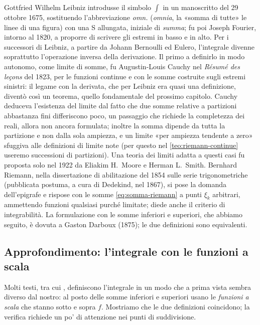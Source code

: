 \begin{notastorica}
Gottfried Wilhelm Leibniz introdusse il simbolo $\int$ in un manoscritto del 29 ottobre
1675, sostituendo l'abbreviazione \emph{omn.} (\emph{omnia}, la «somma di tutte» le
linee di una figura) con una S allungata, iniziale di \emph{summa}; fu poi Joseph
Fourier, intorno al 1820, a proporre di scrivere gli estremi in basso e in alto. Per i
successori di Leibniz, a partire da Johann Bernoulli ed Eulero, l'integrale divenne
soprattutto l'operazione inversa della derivazione. Il primo a definirlo in modo
autonomo, come limite di somme, fu Augustin-Louis Cauchy nel \emph{Résumé des leçons}
del 1823, per le funzioni continue e con le somme costruite sugli estremi sinistri: il
legame con la derivata, che per Leibniz era quasi una definizione, diventò così un
teorema, quello fondamentale del prossimo capitolo. Cauchy deduceva l'esistenza del
limite dal fatto che due somme relative a partizioni abbastanza fini differiscono poco,
un passaggio che richiede la completezza dei reali, allora non ancora formulata; inoltre
la somma dipende da tutta la partizione e non dalla sola ampiezza, e un limite «per
ampiezza tendente a zero» sfuggiva alle definizioni di limite note (per questo nel
\cref{teo:riemann-continue} useremo successioni di partizioni). Una teoria dei limiti
adatta a questi casi fu proposta solo nel 1922 da Eliakim H.~Moore e Herman L.~Smith.
Bernhard Riemann, nella dissertazione di abilitazione del 1854 sulle serie
trigonometriche (pubblicata postuma, a cura di Dedekind, nel 1867), si pose la domanda
dell'epigrafe e rispose con le somme \eqref{eq:somma-riemann} a punti $\xi_{k}$
arbitrari, ammettendo funzioni qualsiasi purché limitate; diede anche il criterio di
integrabilità. La formulazione con le somme inferiori e superiori, che abbiamo seguito,
è dovuta a Gaston Darboux (1875); le due definizioni sono equivalenti.
\end{notastorica}

\subsection{Approfondimento: l'integrale con le funzioni a scala}
\label{subsec:funzioni-scala}

Molti testi, tra cui \cite{giusti}, definiscono l'integrale in un modo che a prima vista
sembra diverso dal nostro: al posto delle somme inferiori e superiori usano le
\emph{funzioni a scala} che stanno sotto e sopra $f$. Mostriamo che le due definizioni
coincidono; la verifica richiede un po' di attenzione nei punti di suddivisione.

